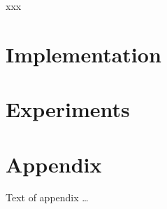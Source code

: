 \documentclass[sigplan,review,anonymous]{acmart}\settopmatter{printfolios=true,printccs=false,printacmref=false}
\begin{document}
\begin{acks}                            %
xxx
\end{acks}

\section{Implementation}

\section{Experiments}




\appendix
\section{Appendix}

Text of appendix \ldots
\end{document}
